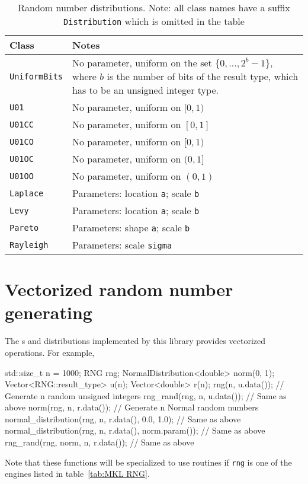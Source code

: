 \begin{table}
  \begin{tabularx}{\textwidth}{lX}
    \toprule
    Class & Notes \\
    \midrule
    \verb|UniformBits|
    & No parameter, uniform on the set $\{0,\dots,2^b - 1\}$, where $b$ is the
    number of bits of the result type, which has to be an unsigned integer
    type. \\
    \verb|U01|      & No parameter, uniform on $[0, 1)$                 \\
    \verb|U01CC|    & No parameter, uniform on $[0, 1]$                 \\
    \verb|U01CO|    & No parameter, uniform on $[0, 1)$                 \\
    \verb|U01OC|    & No parameter, uniform on $(0, 1]$                 \\
    \verb|U01OO|    & No parameter, uniform on $(0, 1)$                 \\
    \verb|Laplace|  & Parameters: location \texttt{a}; scale \texttt{b} \\
    \verb|Levy|     & Parameters: location \texttt{a}; scale \texttt{b} \\
    \verb|Pareto|   & Parameters: shape \texttt{a}; scale \texttt{b}    \\
    \verb|Rayleigh| & Parameters: scale \texttt{sigma}                  \\
    \bottomrule
  \end{tabularx}
  \caption{Random number distributions. Note: all class names have a suffix
    \texttt{Distribution} which is omitted in the table}
  \label{tab:Random number distributions}
\end{table}

\section{Vectorized random number generating}
\label{sec:Vectorized random number generating}

The \rng{}s and distributions implemented by this library provides vectorized
operations. For example,
\begin{cppcode}
  std::size_t n = 1000;
  RNG rng;
  NormalDistribution<double> norm(0, 1);
  Vector<RNG::result_type> u(n);
  Vector<double> r(n);
  rng(n, u.data());           // Generate n random unsigned integers
  rng_rand(rng, n, u.data()); // Same as above
  norm(rng, n, r.data());     // Generate n Normal random numbers
  normal_distribution(rng, n, r.data(), 0.0, 1.0);     // Same as above
  normal_distribution(rng, n, r.data(), norm.param()); // Same as above
  rng_rand(rng, norm, n, r.data());                    // Same as above
\end{cppcode}
Note that these functions will be specialized to use \mkl routines if
\verb|rng| is one of the engines listed in table~\ref{tab:MKL RNG}.
